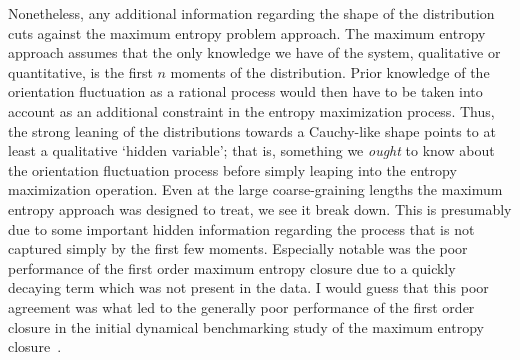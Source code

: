 Nonetheless, any additional information regarding the shape of the distribution cuts against the maximum entropy problem approach. The maximum entropy approach assumes that the only knowledge we have of the system, qualitative or quantitative, is the first \(n\) moments of the distribution. Prior knowledge of the orientation fluctuation as a rational process would then have to be taken into account as an additional constraint in the entropy maximization process. Thus, the strong leaning of the distributions towards a Cauchy-like shape points to at least a qualitative `hidden variable'; that is, something we \emph{ought} to know about the orientation fluctuation process before simply leaping into the entropy maximization operation. Even at the large coarse-graining lengths the maximum entropy approach was designed to treat, we see it break down. This is presumably due to some important hidden information regarding the process that is not captured simply by the first few moments. Especially notable was the poor performance of the first order maximum entropy closure due to a quickly decaying term which was not present in the data. I would guess that this poor agreement was what led to the generally poor performance of the first order closure in the initial dynamical benchmarking study of the maximum entropy closure~\cite{Monavari2016}.

